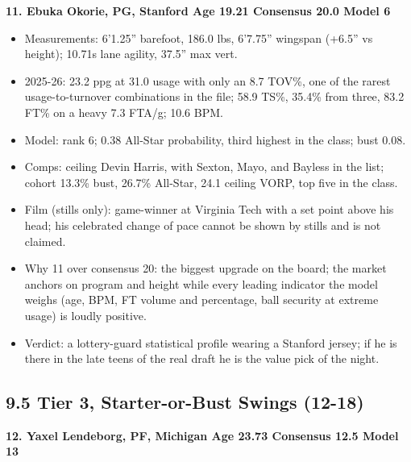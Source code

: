\documentclass[
  10pt,
]{article}
\providecommand{\tightlist}{%
  \setlength{\itemsep}{0pt}\setlength{\parskip}{0pt}}
\begin{document}
\textbf{11. Ebuka Okorie, PG, Stanford \textbar{} Age 19.21 \textbar{} Consensus
20.0 \textbar{} Model 6}

\begin{itemize}
\tightlist
\item
  Measurements: 6'1.25'' barefoot, 186.0 lbs, 6'7.75'' wingspan (+6.5'' vs
  height); 10.71s lane agility, 37.5'' max vert.
\item
  2025-26: 23.2 ppg at 31.0 usage with only an 8.7 TOV\%, one of the rarest
  usage-to-turnover combinations in the file; 58.9 TS\%, 35.4\% from three, 83.2
  FT\% on a heavy 7.3 FTA/g; 10.6 BPM.
\item
  Model: rank 6; 0.38 All-Star probability, third highest in the class; bust
  0.08.
\item
  Comps: ceiling Devin Harris, with Sexton, Mayo, and Bayless in the list;
  cohort 13.3\% bust, 26.7\% All-Star, 24.1 ceiling VORP, top five in the class.
\item
  Film (stills only): game-winner at Virginia Tech with a set point above his
  head; his celebrated change of pace cannot be shown by stills and is not
  claimed.
\item
  Why 11 over consensus 20: the biggest upgrade on the board; the market anchors
  on program and height while every leading indicator the model weighs (age,
  BPM, FT volume and percentage, ball security at extreme usage) is loudly
  positive.
\item
  Verdict: a lottery-guard statistical profile wearing a Stanford jersey; if he
  is there in the late teens of the real draft he is the value pick of the
  night.
\end{itemize}

\subsection{9.5 Tier 3, Starter-or-Bust Swings
(12-18)}\label{tier-3-starter-or-bust-swings-12-18}

\textbf{12. Yaxel Lendeborg, PF, Michigan \textbar{} Age 23.73 \textbar{}
Consensus 12.5 \textbar{} Model 13}
\end{document}
